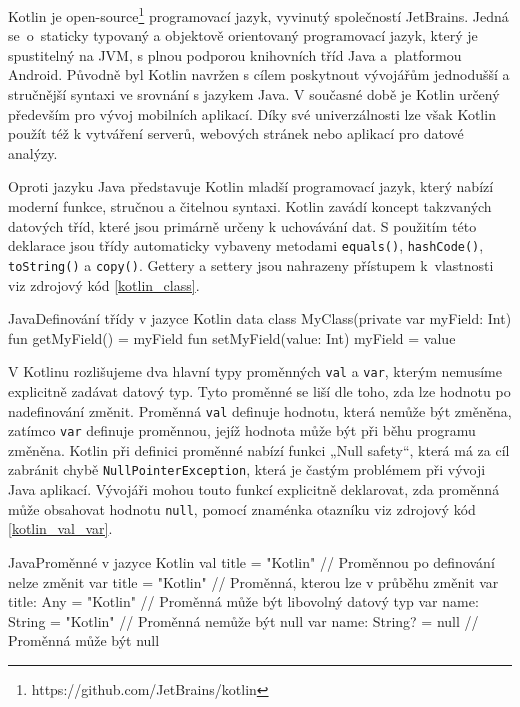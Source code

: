 \documentclass[czech, bc, kiv, he, iso690numb]{fasthesis}
\begin{document}
Kotlin je open-source\footnote{https://github.com/JetBrains/kotlin} programovací jazyk, vyvinutý společností JetBrains. Jedná se~o~staticky typovaný a objektově orientovaný programovací jazyk, který je spustitelný na \gls{JVM}, s plnou podporou knihovních tříd Java a~platformou Android. Původně byl Kotlin navržen s cílem poskytnout vývojářům jednodušší a stručnější syntaxi ve srovnání s jazykem Java. V současné době je Kotlin určený především pro vývoj mobilních aplikací. Díky své univerzálnosti lze však Kotlin použít též k vytváření serverů, webových stránek nebo aplikací pro datové analýzy. \cite{kotlin-docs} \cite{techtarget-kotlin}

Oproti jazyku Java představuje Kotlin mladší programovací jazyk, který nabízí moderní funkce, stručnou a čitelnou syntaxi. Kotlin zavádí koncept takzvaných datových tříd, které jsou primárně určeny k uchovávání dat. S použitím této deklarace jsou třídy automaticky vybaveny metodami \texttt{equals()}, \texttt{hashCode()}, \texttt{toString()} a \texttt{copy()}. Gettery a settery jsou nahrazeny přístupem k~vlastnosti viz zdrojový kód \ref{kotlin_class}.

\begin{code}{Java}{Definování třídy v jazyce Kotlin \label{kotlin_class}}
data class MyClass(private var myField: Int) {
   fun getMyField() = myField
   fun setMyField(value: Int) { myField = value }
}
\end{code}

V Kotlinu rozlišujeme dva hlavní typy proměnných \texttt{val} a \texttt{var}, kterým nemusíme explicitně zadávat datový typ. Tyto proměnné se liší dle toho, zda lze hodnotu po nadefinování změnit. Proměnná \texttt{val} definuje hodnotu, která nemůže být změněna, zatímco \texttt{var} definuje proměnnou, jejíž hodnota může být při běhu programu změněna. Kotlin při definici proměnné nabízí funkci „Null safety“, která má za cíl zabránit chybě \texttt{NullPointerException}, která je častým problémem při vývoji Java aplikací. Vývojáři mohou touto funkcí explicitně deklarovat, zda proměnná může obsahovat hodnotu \texttt{null}, pomocí znaménka otazníku viz zdrojový kód \ref{kotlin_val_var}.

\begin{code}{Java}{Proměnné v jazyce Kotlin \label{kotlin_val_var}}
val title = "Kotlin" // Proměnnou po definování nelze změnit
var title = "Kotlin" // Proměnná, kterou lze v průběhu změnit
var title: Any = "Kotlin" // Proměnná může být libovolný datový typ
var name: String = "Kotlin" // Proměnná nemůže být null
var name: String? = null // Proměnná může být null
\end{code}
\end{document}

